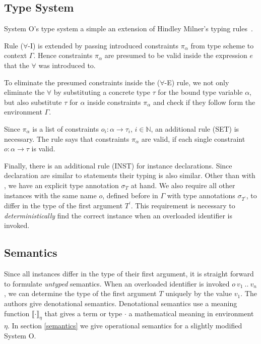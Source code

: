 \documentclass[runningheads]{llncs}
\newcommand{\snip}[1]{\footnotesize{\ttfamily{#1}}}
\begin{document}
\subsection{Type System}
System O's type system a simple an extension of Hindley Milner's typing rules~\cite{dm82}. 

Rule ($\forall$-I) is extended by passing introduced constraints $\pi_\alpha$ from type scheme to context $\Gamma$. 
Hence constraints $\pi_\alpha$ are presumed to be valid inside the expression $e$ that the $\forall$ was introduced to. 

To eliminate the presumed constraints inside the ($\forall$-E) rule, we not only eliminate the $\forall$ by substituting a concrete type $\tau$ for the bound type variable $\alpha$, but also substitute $\tau$ for $\alpha$ inside constraints $\pi_\alpha$ and check if they follow form the environment $\Gamma$. 

Since $\pi_\alpha$ is a list of constraints $o_i : \alpha \rightarrow \tau_i$, $i \in \mathbb{N}$, an additional rule (SET) is necessary. 
The rule says that constraints $\pi_\alpha$ are valid, if each single constraint $o: \alpha \rightarrow \tau$ is valid.

Finally, there is an additional rule (INST) for instance declarations. 
Since \snip{inst} declaration are similar to \snip{let} statements their typing is also similar. 
Other than with \snip{let}, we have an explicit type annotation $\sigma_T$ at hand. 
We also require all other instances with the same name $o$, defined before in $\Gamma$ with type annotations $\sigma_{T^\prime}$, to differ in the type of the first argument $T^\prime$. 
This requirement is necessary to \emph{deterministically} find the correct instance when an overloaded identifier is invoked.

\subsection{Semantics}
Since all instances differ in the type of their first argument, it is straight forward to formulate \emph{untyped} semantics.
When an overloaded identifier is invoked $o \ v_1 \ .. \ v_n$, we can determine the type of the first argument $T$ uniquely by the value $v_1$. 
The authors give denotational semantics. Denotational semantics use a meaning function $\llbracket \cdot \rrbracket_\eta$ that gives a term or type $\cdot$ a mathematical meaning in environment $\eta$.
In section \ref{semantics} we give operational semantics for a slightly modified System O. 
\end{document}
